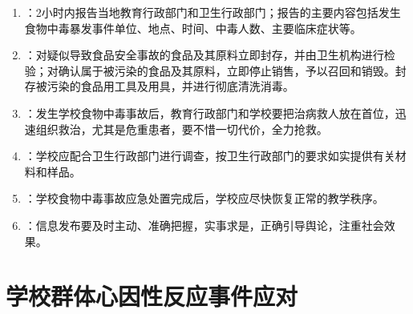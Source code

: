 \begin{keybox}
\begin{enumerate}[leftmargin=*]
    \item {}：2小时内报告当地教育行政部门和卫生行政部门；报告的主要内容包括发生食物中毒暴发事件单位、地点、时间、中毒人数、主要临床症状等。
    \item {}：对疑似导致食品安全事故的食品及其原料立即封存，并由卫生机构进行检验；对确认属于被污染的食品及其原料，立即停止销售，予以召回和销毁。封存被污染的食品用工具及用具，并进行彻底清洗消毒。
    \item {}：发生学校食物中毒事故后，教育行政部门和学校要把治病救人放在首位，迅速组织救治，尤其是危重患者，要不惜一切代价，全力抢救。
    \item {}：学校应配合卫生行政部门进行调查，按卫生行政部门的要求如实提供有关材料和样品。
    \item {}：学校食物中毒事故应急处置完成后，学校应尽快恢复正常的教学秩序。
    \item {}：信息发布要及时主动、准确把握，实事求是，正确引导舆论，注重社会效果。
\end{enumerate}
\end{keybox}

\section{学校群体心因性反应事件应对}


